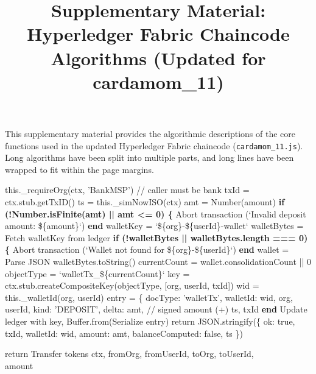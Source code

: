 \documentclass[12pt]{article}
\title{Supplementary Material: Hyperledger Fabric Chaincode Algorithms (Updated for cardamom\_11)}
\author{}
\date{}
\begin{document}
\maketitle

This supplementary material provides the algorithmic descriptions of the core functions used in the updated Hyperledger Fabric chaincode (\texttt{cardamom\_11.js}). 
Long algorithms have been split into multiple parts, and long lines have been wrapped to fit within the page margins.

\vspace{1cm}

\begin{algorithm}[H]
\caption{depositMoney()}
this.\_requireOrg(ctx, 'BankMSP') // caller must be bank\;
txId = ctx.stub.getTxID()\;
ts = this.\_simNowISO(ctx)\;
amt = Number(amount)\;
\textbf{if (!Number.isFinite(amt) || amt <= 0) \{}\;
Abort transaction (`Invalid deposit amount: \$\{amount\}`)\;
\textbf{end}\;
walletKey = `\$\{org\}-\$\{userId\}-wallet`\;
walletBytes = Fetch walletKey from ledger\;
\textbf{if (!walletBytes || walletBytes.length === 0) \{}\;
Abort transaction (`Wallet not found for \$\{org\}-\$\{userId\}`)\;
\textbf{end}\;
wallet = Parse JSON walletBytes.toString()\;
currentCount = wallet.consolidationCount || 0\;
objectType = `walletTx\_\$\{currentCount\}`\;
key = ctx.stub.createCompositeKey(objectType, [org, userId, txId])\;
wid = this.\_walletId(org, userId)\;
entry = \{\;
docType: 'walletTx',\;
walletId: wid,\;
org, userId,\;
kind: 'DEPOSIT',\;
delta: amt,           // signed amount (+)\;
ts, txId\;
\textbf{end}\;
Update ledger with key, Buffer.from(Serialize entry)\;
return JSON.stringify(\{\;
ok: true,\;
txId,\;
walletId: wid,\;
amount: amt,\;
balanceComputed: false,\;
ts\;
\})\;
\end{algorithm}


\begin{algorithm}[H]
\caption{transferMoney()}
return Transfer tokens ctx, fromOrg, fromUserId, toOrg, toUserId,\\
\quad amount\;
\end{algorithm}
\end{document}
